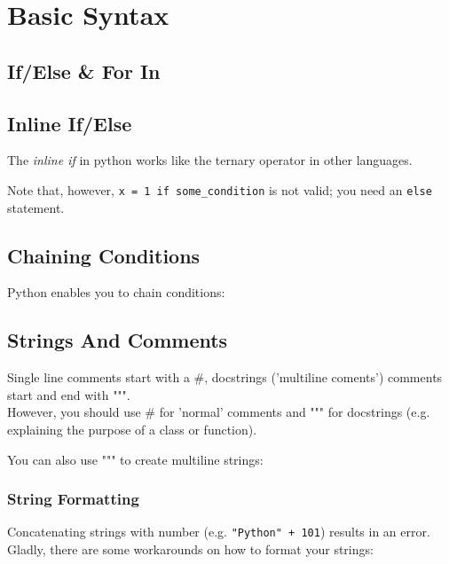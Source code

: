 \section{Basic Syntax}

  \subsection{If/Else \& For In}

  \subsection{Inline If/Else}
    The \textit{inline if} in python works like the ternary operator in other languages.
    
    Note that, however, \texttt{x = 1 if some_condition} is not valid; you need an \texttt{else} statement.

  \subsection{Chaining Conditions}
    Python enables you to chain conditions:
    

  \subsection{Strings And Comments}
    Single line comments start with a \#, docstrings ('multiline coments') comments start and end with """. \\
    However, you should use # for 'normal' comments and """ for docstrings (e.g. explaining the purpose of a class or function).
    
    You can also use """ to create multiline strings:
    

    \subsubsection{String Formatting}
      Concatenating strings with number (e.g. \texttt{"Python" + 101}) results in an error. \\
      Gladly, there are some workarounds on how to format your strings:
    
